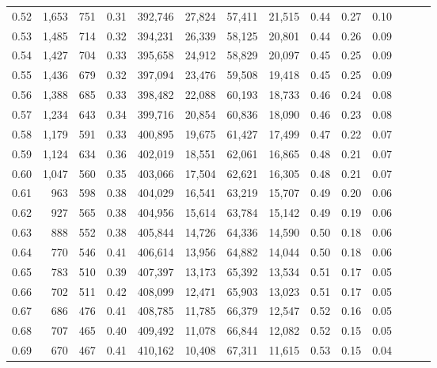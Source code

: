 \begin{tabular}{rrrrrrrrrrrrrr}
0.52 &   1,653 &    751 &  0.31 &  392,746 &   27,824 &  57,411 &  21,515 &  0.44 &  0.27 &      0.10 \\
0.53 &   1,485 &    714 &  0.32 &  394,231 &   26,339 &  58,125 &  20,801 &  0.44 &  0.26 &      0.09 \\
0.54 &   1,427 &    704 &  0.33 &  395,658 &   24,912 &  58,829 &  20,097 &  0.45 &  0.25 &      0.09 \\
0.55 &   1,436 &    679 &  0.32 &  397,094 &   23,476 &  59,508 &  19,418 &  0.45 &  0.25 &      0.09 \\
0.56 &   1,388 &    685 &  0.33 &  398,482 &   22,088 &  60,193 &  18,733 &  0.46 &  0.24 &      0.08 \\
0.57 &   1,234 &    643 &  0.34 &  399,716 &   20,854 &  60,836 &  18,090 &  0.46 &  0.23 &      0.08 \\
0.58 &   1,179 &    591 &  0.33 &  400,895 &   19,675 &  61,427 &  17,499 &  0.47 &  0.22 &      0.07 \\
0.59 &   1,124 &    634 &  0.36 &  402,019 &   18,551 &  62,061 &  16,865 &  0.48 &  0.21 &      0.07 \\
0.60 &   1,047 &    560 &  0.35 &  403,066 &   17,504 &  62,621 &  16,305 &  0.48 &  0.21 &      0.07 \\
0.61 &     963 &    598 &  0.38 &  404,029 &   16,541 &  63,219 &  15,707 &  0.49 &  0.20 &      0.06 \\
0.62 &     927 &    565 &  0.38 &  404,956 &   15,614 &  63,784 &  15,142 &  0.49 &  0.19 &      0.06 \\
0.63 &     888 &    552 &  0.38 &  405,844 &   14,726 &  64,336 &  14,590 &  0.50 &  0.18 &      0.06 \\
0.64 &     770 &    546 &  0.41 &  406,614 &   13,956 &  64,882 &  14,044 &  0.50 &  0.18 &      0.06 \\
0.65 &     783 &    510 &  0.39 &  407,397 &   13,173 &  65,392 &  13,534 &  0.51 &  0.17 &      0.05 \\
0.66 &     702 &    511 &  0.42 &  408,099 &   12,471 &  65,903 &  13,023 &  0.51 &  0.17 &      0.05 \\
0.67 &     686 &    476 &  0.41 &  408,785 &   11,785 &  66,379 &  12,547 &  0.52 &  0.16 &      0.05 \\
0.68 &     707 &    465 &  0.40 &  409,492 &   11,078 &  66,844 &  12,082 &  0.52 &  0.15 &      0.05 \\
0.69 &     670 &    467 &  0.41 &  410,162 &   10,408 &  67,311 &  11,615 &  0.53 &  0.15 &      0.04 \\

\end{tabular}
